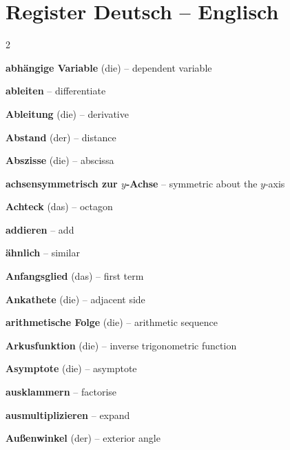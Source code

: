 \section{Register Deutsch -- Englisch}
\begin{multicols}{2}\small\raggedright

\par\nopagebreak
\textbf{abhängige Variable} (die) -- dependent variable\dotfill\hyperref[e:107]{\pageref*{e:107}}\par
\textbf{ableiten} -- differentiate\dotfill\hyperref[e:278]{\pageref*{e:278}}\par
\textbf{Ableitung} (die) -- derivative\dotfill\hyperref[e:273]{\pageref*{e:273}}\par
\textbf{Abstand} (der) -- distance\dotfill\hyperref[e:152]{\pageref*{e:152}}\par
\textbf{Abszisse} (die) -- abscissa\dotfill\hyperref[e:117]{\pageref*{e:117}}\par
\textbf{achsensymmetrisch zur $y$-Achse} -- symmetric about the $y$-axis\dotfill\hyperref[e:144]{\pageref*{e:144}}\par
\textbf{Achteck} (das) -- octagon\dotfill\hyperref[e:207]{\pageref*{e:207}}\par
\textbf{addieren} -- add\dotfill\hyperref[e:14]{\pageref*{e:14}}\par
\textbf{ähnlich} -- similar\dotfill\hyperref[e:176]{\pageref*{e:176}}\par
\textbf{Anfangsglied} (das) -- first term\dotfill\hyperref[e:261]{\pageref*{e:261}}\par
\textbf{Ankathete} (die) -- adjacent side\dotfill\hyperref[e:188]{\pageref*{e:188}}\par
\textbf{arithmetische Folge} (die) -- arithmetic sequence\dotfill\hyperref[e:259]{\pageref*{e:259}}\par
\textbf{Arkusfunktion} (die) -- inverse trigonometric function\dotfill\hyperref[e:136]{\pageref*{e:136}}\par
\textbf{Asymptote} (die) -- asymptote\dotfill\hyperref[e:271]{\pageref*{e:271}}\par
\textbf{ausklammern} -- factorise\dotfill\hyperref[e:92]{\pageref*{e:92}}\par
\textbf{ausmultiplizieren} -- expand\dotfill\hyperref[e:91]{\pageref*{e:91}}\par
\textbf{Außenwinkel} (der) -- exterior angle\dotfill\hyperref[e:179]{\pageref*{e:179}}\par


\end{multicols}
